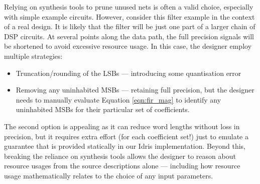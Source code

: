 \documentclass[conference]{IEEEtran}
\begin{document}
Relying on synthesis tools to prune unused nets is often a valid choice,
especially with simple example circuits. However, consider this filter example
in the context of a real design. It is likely that the filter will be just one
part of a larger chain of DSP circuits. At several points along the data path,
the full precision signals will be shortened to avoid excessive resource
usage. In this case, the designer employ multiple strategies:

\begin{itemize}
\item Truncation/rounding of the LSBs --- introducing some quantisation error
\item Removing any uninhabited MSBs --- retaining full precision, but the
  designer needs to manually evaluate Equation \ref{eqn:fir_mag} to identify any
  uninhabited MSBs for their particular set of coefficients.
\end{itemize}

The second option is appealing as it can reduce word lengths without loss in
precision, but it requires extra effort (for each coefficient set!) just to
emulate a guarantee that is provided statically in our Idris implementation.
Beyond this, breaking the reliance on synthesis tools allows the designer to
reason about resource usages from the source descriptions alone --- including
how resource usage mathematically relates to the choice of any input parameters.

\end{document}
